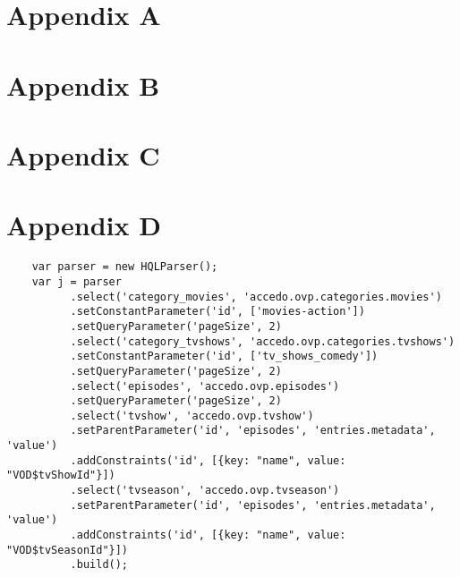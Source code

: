 \begin{appendices}

\chapter{Appendix A}
	 \lstset{basicstyle=\footnotesize\ttfamily}
	 

\chapter{Appendix B}
	 

\chapter{Appendix C}
	 \lstset{basicstyle=\footnotesize\ttfamily}
	 


\chapter{Appendix D}

\begin{lstlisting}
	var parser = new HQLParser();
	var j = parser
		  .select('category_movies', 'accedo.ovp.categories.movies')
		  .setConstantParameter('id', ['movies-action'])
		  .setQueryParameter('pageSize', 2)
		  .select('category_tvshows', 'accedo.ovp.categories.tvshows')
		  .setConstantParameter('id', ['tv_shows_comedy'])
		  .setQueryParameter('pageSize', 2)
		  .select('episodes', 'accedo.ovp.episodes')
		  .setQueryParameter('pageSize', 2)
		  .select('tvshow', 'accedo.ovp.tvshow')
		  .setParentParameter('id', 'episodes', 'entries.metadata', 'value')
		  .addConstraints('id', [{key: "name", value: "VOD$tvShowId"}])
		  .select('tvseason', 'accedo.ovp.tvseason')
		  .setParentParameter('id', 'episodes', 'entries.metadata', 'value')
		  .addConstraints('id', [{key: "name", value: "VOD$tvSeasonId"}])
		  .build();

\end{lstlisting}

\end{appendices}
